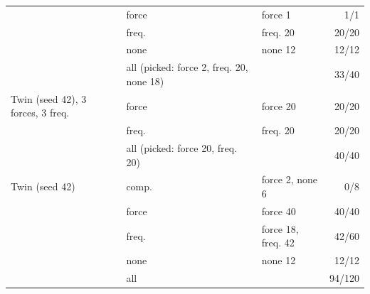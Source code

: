 \begin{tabular}{l l l r}
 & force & force 1 & 1/1 \\
 & freq. & freq. 20 & 20/20 \\
 & none & none 12 & 12/12 \\
 & all (picked: force 2, freq. 20, none 18) & & 33/40 \\
\addlinespace
Twin (seed 42), 3 forces, 3 freq. & force & force 20 & 20/20 \\
 & freq. & freq. 20 & 20/20 \\
 & all (picked: force 20, freq. 20) & & 40/40 \\
\addlinespace
Twin (seed 42) & comp. & force 2, none 6 & 0/8 \\
 & force & force 40 & 40/40 \\
 & freq. & force 18, freq. 42 & 42/60 \\
 & none & none 12 & 12/12 \\
 & all & & 94/120 \\
\bottomrule
\end{tabular}
